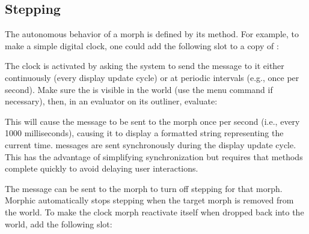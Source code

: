 \documentclass[letterpaper,10pt,english]{sphinxmanual}
\begin{document}
\subsection{Stepping}
\label{\detokenize{morphic:stepping}}
The autonomous behavior of a morph is defined by its  method. For example, to make a simple digital clock, one could add the following slot to a copy of :

\begin{sphinxVerbatim}[commandchars=\\\{\}]
       
\end{sphinxVerbatim}

The clock is activated by asking the system to send the \sphinxquotedblleft{} message to it either continuously (every display update cycle) or at periodic intervals (e.g., once per second). Make sure the  is visible in the world (use the  menu command if necessary), then, in an evaluator on its outliner, evaluate:

\begin{sphinxVerbatim}[commandchars=\\\{\}]
 
\end{sphinxVerbatim}

This will cause the  message to be sent to the morph once per second (i.e., every 1000 milliseconds), causing it to display a formatted string representing the current time.  messages are sent synchronously during the display update cycle. This has the advantage of simplifying synchronization but requires that  methods complete quickly to avoid delaying user interactions.

The message  can be sent to the morph to turn off stepping for that morph. Morphic automatically stops stepping when the target morph is removed from the world. To make the clock morph reactivate itself when dropped back into the world, add the following slot:

\begin{sphinxVerbatim}[commandchars=\\\{\}]
     
      \PYG{p}{[}   \PYG{p}{]}
\end{sphinxVerbatim}
\end{document}
